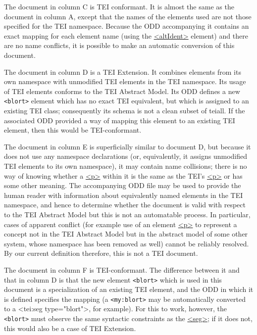 The document in column C is  TEI conformant. It is almost the same as the document in column A, except that the names of the elements used are not those specified for the TEI namespace. Because the ODD accompanying it contains an exact mapping for each element name (using the \hyperref[TEI.altIdent]{<altIdent>} element) and there are no name conflicts, it is possible to make an automatic conversion of this document.\par
The document in column D is a TEI Extension. It combines elements from its own namespace with unmodified TEI elements in the TEI namespace. Its usage of TEI elements conforms to the TEI Abstract Model. Its ODD defines a new \texttt{<blort>} element which has no exact TEI equivalent, but which is assigned to an existing TEI class; consequently its schema is not a clean subset of \textsf{tei\textunderscore all}. If the associated ODD provided a way of mapping this element to an existing TEI element, then this would be TEI-conformant.\par
The document in column E is superficially similar to document D, but because it does not use any namespace declarations (or, equivalently, it assigns unmodified TEI elements to its own namespace), it may contain name collisions; there is no way of knowing whether a \hyperref[TEI.p]{<p>} within it is the same as the TEI's \hyperref[TEI.p]{<p>} or has some other meaning. The accompanying ODD file may be used to provide the human reader with information about equivalently named elements in the TEI namespace, and hence to determine whether the document is valid with respect to the TEI Abstract Model but this is not an automatable process. In particular, cases of apparent conflict (for example use of an element \hyperref[TEI.p]{<p>} to represent a concept not in the TEI Abstract Model but in the abstract model of some other system, whose namespace has been removed as well) cannot be reliably resolved. By our current definition therefore, this is not a TEI document.\par
The document in column F is TEI-conformant. The difference between it and that in column D is that the new element \texttt{<blort>} which is used in this document is a specialization of an existing TEI element, and the ODD in which it is defined specifies the mapping (a \texttt{<my:blort>} may be automatically converted to a <tei:seg type="blort">, for example). For this to work, however, the \texttt{<blort>} must observe the same syntactic constraints as the \hyperref[TEI.seg]{<seg>}; if it does not, this would also be a case of TEI Extension.\par
